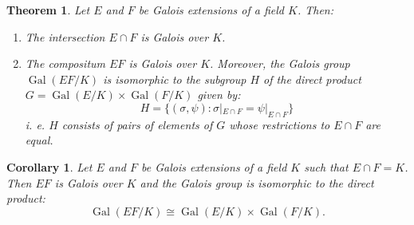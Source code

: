 \documentclass[12pt]{article}
\newtheorem{thm}{Theorem}
\newtheorem{cor}{Corollary}
\newcommand{\Gal}{\operatorname{Gal}}
\begin{document}
\begin{thm}
Let $E$ and $F$ be Galois extensions of a field $K$. Then:
\begin{enumerate}
\item The intersection $E\cap F$ is Galois over $K$.\\
\item The compositum $EF$ is Galois over $K$. Moreover, the Galois group $\Gal(EF/K)$ is isomorphic to the subgroup $H$ of the direct product $G=\Gal(E/K)\times \Gal(F/K)$ given by:
$$H=\{ (\sigma, \psi) : \sigma|_{E\cap F}=\psi|_{E\cap F} \}$$
i. e. $H$ consists of pairs of elements of $G$ whose restrictions to $E\cap F$ are equal.
\end{enumerate}
\end{thm}

\begin{cor}
Let $E$ and $F$ be Galois extensions of a field $K$ such that $E\cap F=K$. Then $EF$ is Galois over $K$ and the Galois group is isomorphic to the direct product:
$$\Gal(EF/K)\cong \Gal(E/K) \times \Gal(F/K).$$
\end{cor}
\end{document}

